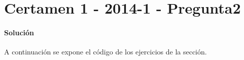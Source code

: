 \section{Certamen 1 - 2014-1 - Pregunta2}

    \paragraph{Solución}
    A continuación se expone el código de los ejercicios de la sección.
    
    
